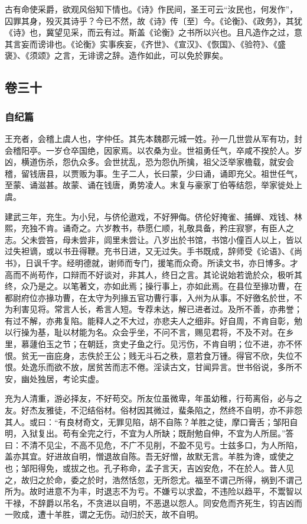 \documentclass[]{article}
\begin{document}
古有命使采爵，欲观风俗知下情也。《诗》作民间，圣王可云``汝民也，何发作''，囚罪其身，殁灭其诗乎？今已不然，故《诗》传〔至〕今。《论衡》、《政务》，其犹《诗》也，冀望见采，而云有过。斯盖《论衡》之书所以兴也。且凡造作之过，意其言妄而谤诽也。《论衡》实事疾妄，《齐世》、《宣汉》、《恢国》、《验符》、《盛褒》、《须颂》之言，无诽谤之辞。造作如此，可以免於罪矣。

\hypertarget{header-n909}{%
\subsection{卷三十}\label{header-n909}}

\hypertarget{header-n910}{%
\subsubsection{自纪篇}\label{header-n910}}

王充者，会稽上虞人也，字仲任。其先本魏郡元城一姓。孙一几世尝从军有功，封会稽阳亭。一岁仓卒国绝，因家焉。以农桑为业。世祖勇任气，卒咸不揆於人。岁凶，横道伤杀，怨仇众多。会世扰乱，恐为怨仇所擒，祖父泛举家檐载，就安会稽，留钱唐县，以贾贩为事。生子二人，长曰蒙，少曰诵，诵即充父。祖世任气，至蒙、诵滋甚。故蒙、诵在钱唐，勇势凌人。末复与豪家丁伯等结怨，举家徙处上虞。

建武三年，充生。为小兒，与侪伦遨戏，不好狎侮。侪伦好掩雀、捕蝉、戏钱、林熙，充独不肯。诵奇之。六岁教书，恭愿仁顺，礼敬具备，矜庄寂寥，有臣人之志。父未尝笞，母未尝非，闾里未尝让。八岁出於书馆，书馆小僮百人以上，皆以过失袒谪，或以书丑得鞭。充书日进，又无过失。手书既成，辞师受《论语》、《尚书》，日讽千字。经明德就，谢师而专门，援笔而众奇。所读文书，亦日博多。才高而不尚苟作，口辩而不好谈对，非其人，终日之言。其论说始若诡於众，极听其终，众乃是之。以笔著文，亦如此焉；操行事上，亦如此焉。在县位至掾功曹，在都尉府位亦掾功曹，在太守为列掾五官功曹行事，入州为从事。不好徼名於世，不为利害见将。常言人长，希言人短。专荐未达，解已进者过。及所不善，亦弗誉；有过不解，亦弗复陷。能释人之不大过，亦悲夫人之细非。好自周，不肯自彰，勉以行操为基，耻以材能为名。众会乎坐，不问不言，赐见君将，不及不对。在乡里，慕蘧伯玉之节；在朝廷，贪史子鱼之行。见污伤，不肯自明；位不进，亦不怀恨。贫无一亩庇身，志佚於王公；贱无斗石之秩，意若食万锺。得官不欣，失位不恨。处逸乐而欲不放，居贫苦而志不倦。淫读古文，甘闻异言。世书俗说，多所不安，幽处独居，考论实虚。

充为人清重，游必择友，不好苟交。所友位虽微卑，年虽幼稚，行苟离俗，必与之友。好杰友雅徒，不氾结俗材。俗材因其微过，蜚条陷之，然终不自明，亦不非怨其人。或曰：``有良材奇文，无罪见陷，胡不自陈？羊胜之徒，摩口膏舌；邹阳自明，入狱复出。苟有全完之行，不宜为人所缺；既耐勉自伸，不宜为人所屈。''答曰：不清不见尘，不高不见危，不广不见削，不盈不见亏。士兹多口，为人所陷，盖亦其宜。好进故自明，憎退故自陈。吾无好憎，故默无言。羊胜为谗，或使之也；邹阳得免，或拔之也。孔子称命，孟子言天，吉凶安危，不在於人。昔人见之，故归之於命，委之於时，浩然恬忽，无所怨尤。福至不谓己所得，祸到不谓己所为。故时进意不为丰，时退志不为亏。不嫌亏以求盈，不违险以趋平，不鬻智以干禄，不辞爵以吊名，不贪进以自明，不恶退以怨人。同安危而齐死生，钧吉凶而一败成，遭十羊胜，谓之无伤。动归於天，故不自明。
\end{document}
